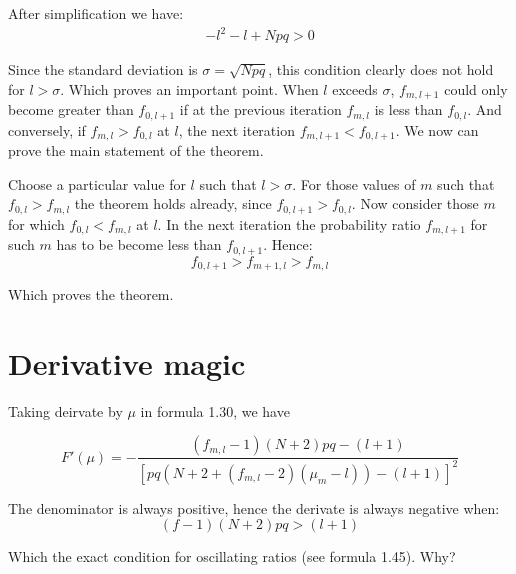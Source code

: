 \documentclass[11pt,draft]{article}
\begin{document}
After simplification we have:
\begin{align}
-l^2 - l +Npq > 0
\end{align}

Since the standard deviation is $\sigma = \sqrt{Npq}$, this condition clearly does not hold for $l>\sigma$.  Which proves an important point. When $l$ exceeds $\sigma$,  $f_{m,l+1}$ could only become greater than $f_{0,l+1}$ if at the previous iteration $f_{m,l}$ is less than $f_{0,l}$.  And conversely, if $f_{m,l} > f_{0,l}$ at $l$, the next iteration $f_{m,l+1} < f_{0,l+1}$.  We now can prove the main statement of the theorem.

Choose a particular value for $l$ such that $l>\sigma$.  For those values of $m$ such that $f_{0,l} > f_{m,l}$ the theorem holds already, since $f_{0,l+1} > f_{0,l}$.  
Now consider those $m$ for which $f_{0,l} < f_{m,l}$ at $l$.  In the next iteration the probability ratio $f_{m,l+1}$ for such $m$ has to be become less than $f_{0,l+1}$.  Hence:
\[ f_{0,l+1} > f_{m+1,l} > f_{m,l} \]

Which proves the theorem.  

\section{Derivative magic}

Taking deirvate by $\mu$ in formula 1.30, we have

\[ F'(\mu) = -\frac{ (f_{m,l}-1)(N+2)pq - (l+1) }{[ pq(N+2 + (f_{m,l}-2)(\mu_m -l )) - (l+1)]^2}  \]

The denominator is always positive, hence the derivate is always negative when:
\[ (f-1)(N+2)pq > (l+1)  \]

Which the exact condition for oscillating ratios (see formula 1.45).  Why?
\end{document}
